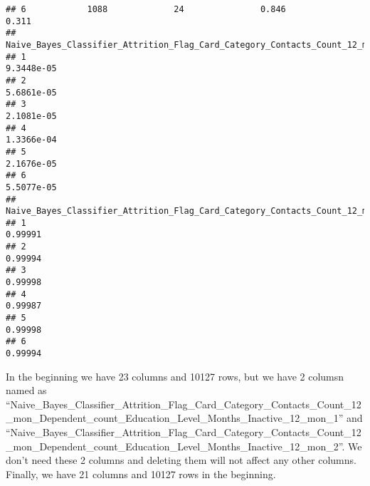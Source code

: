 \documentclass[
]{article}
\begin{document}
\begin{verbatim}
## 6            1088             24               0.846                 0.311
##   Naive_Bayes_Classifier_Attrition_Flag_Card_Category_Contacts_Count_12_mon_Dependent_count_Education_Level_Months_Inactive_12_mon_1
## 1                                                                                                                         9.3448e-05
## 2                                                                                                                         5.6861e-05
## 3                                                                                                                         2.1081e-05
## 4                                                                                                                         1.3366e-04
## 5                                                                                                                         2.1676e-05
## 6                                                                                                                         5.5077e-05
##   Naive_Bayes_Classifier_Attrition_Flag_Card_Category_Contacts_Count_12_mon_Dependent_count_Education_Level_Months_Inactive_12_mon_2
## 1                                                                                                                            0.99991
## 2                                                                                                                            0.99994
## 3                                                                                                                            0.99998
## 4                                                                                                                            0.99987
## 5                                                                                                                            0.99998
## 6                                                                                                                            0.99994
\end{verbatim}

In the beginning we have 23 columns and 10127 rows, but we have 2
columsn named as
``Naive\_Bayes\_Classifier\_Attrition\_Flag\_Card\_Category\_Contacts\_Count\_12\_mon\_Dependent\_count\_Education\_Level\_Months\_Inactive\_12\_mon\_1''
and
``Naive\_Bayes\_Classifier\_Attrition\_Flag\_Card\_Category\_Contacts\_Count\_12\_mon\_Dependent\_count\_Education\_Level\_Months\_Inactive\_12\_mon\_2''.
We don't need these 2 columns and deleting them will not affect any
other columns. Finally, we have 21 columns and 10127 rows in the
beginning.
\end{document}

